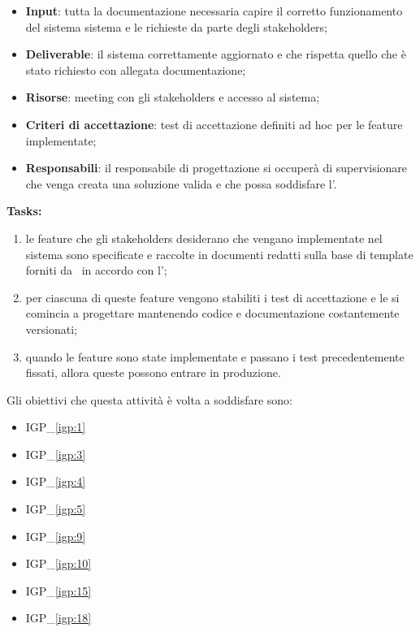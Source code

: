 		\begin{itemize}[noitemsep]
			\renewcommand\labelitemi{--}
			\item \textbf{Input}: tutta la documentazione necessaria capire il corretto funzionamento del sistema sistema e le richieste da parte degli stakeholders;
			\item \textbf{Deliverable}: il sistema correttamente aggiornato e che rispetta quello che è stato richiesto con allegata documentazione;
			\item \textbf{Risorse}: meeting con gli stakeholders e accesso al sistema;
			\item \textbf{Criteri di accettazione}: test di accettazione definiti ad hoc per le feature implementate;
			\item \textbf{Responsabili}: il responsabile di progettazione si occuperà di supervisionare che venga creata una soluzione valida e che possa soddisfare l'\istituto.
		\end{itemize}
		
		\textbf{Tasks:}
		\begin{enumerate}[noitemsep]
			\item le feature che gli stakeholders desiderano che vengano implementate nel sistema sono specificate e raccolte in documenti redatti sulla base di template forniti da \azienda~in accordo con l'\istituto;
			\item per ciascuna di queste feature vengono stabiliti i test di accettazione e le si comincia a progettare mantenendo codice e documentazione costantemente versionati;
			\item quando le feature sono state implementate e passano i test precedentemente fissati, allora queste possono entrare in produzione.
		\end{enumerate}
	
		Gli obiettivi che questa attività è volta a soddisfare sono:
		\begin{itemize}[noitemsep]
			\renewcommand\labelitemi{--}
			\item {\color{pantone}IGP\_\ref{igp:1}}
			\item {\color{pantone}IGP\_\ref{igp:3}}
			\item {\color{pantone}IGP\_\ref{igp:4}}
			\item {\color{pantone}IGP\_\ref{igp:5}}
			\item {\color{pantone}IGP\_\ref{igp:9}}
			\item {\color{pantone}IGP\_\ref{igp:10}}
			\item {\color{pantone}IGP\_\ref{igp:15}}
			\item {\color{pantone}IGP\_\ref{igp:18}}
		\end{itemize}
	
